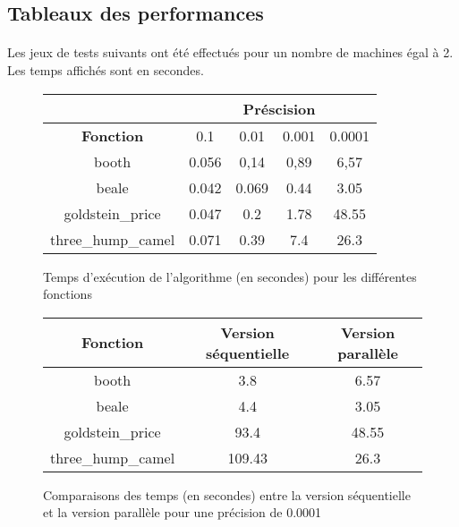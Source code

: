\subsection{Tableaux des performances}
    
    \paragraph{}
    Les jeux de tests suivants ont été effectués pour un nombre de machines égal à 2. Les temps affichés sont en secondes.
    
    \begin{figure}[!h]
        \begin{center}
            \begin{tabular}{|c|c|c|c|c|}
            \hline
                 & \multicolumn{4}{c|}{\textbf{Préscision}} \\ \hline
                \textbf{Fonction} & 0.1 & 0.01 & 0.001 & 0.0001 \\ \hline
                booth & 0.056 & 0,14 & 0,89 & 6,57 \\ \hline
                beale & 0.042 & 0.069 & 0.44 & 3.05 \\ \hline
                goldstein\_price & 0.047 & 0.2 & 1.78 & 48.55  \\ \hline
                three\_hump\_camel & 0.071 & 0.39 & 7.4 & 26.3 \\ \hline
            \end{tabular}
            \caption{Temps d'exécution de l'algorithme (en secondes) pour les différentes fonctions}
            \label{tab:omp}
        \end{center}
    \end{figure}
    
    \begin{figure}[!h]
        \begin{center}
            \begin{tabular}{|c|c|c|}
            \hline
                \textbf{Fonction} & \textbf{Version séquentielle} & \textbf{Version parallèle} \\ \hline
                booth & 3.8 & 6.57  \\ \hline
                beale & 4.4 & 3.05  \\ \hline
                goldstein\_price & 93.4 & 48.55   \\ \hline
                three\_hump\_camel & 109.43 & 26.3 \\ \hline
            \end{tabular}
            \caption{Comparaisons des temps (en secondes) entre la version séquentielle et la version parallèle pour une précision de 0.0001}
            \label{tab:compare-omp}
        \end{center}
    \end{figure}
    
